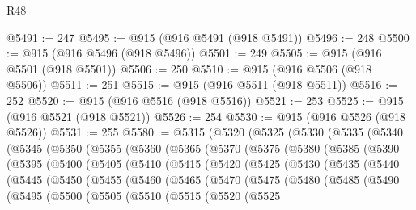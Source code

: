 \begin{lexlean}{R48}
\begin{coremodule}
@5491 := 247
@5495 := @915 (@916 @5491 (@918 @5491))
@5496 := 248
@5500 := @915 (@916 @5496 (@918 @5496))
@5501 := 249
@5505 := @915 (@916 @5501 (@918 @5501))
@5506 := 250
@5510 := @915 (@916 @5506 (@918 @5506))
@5511 := 251
@5515 := @915 (@916 @5511 (@918 @5511))
@5516 := 252
@5520 := @915 (@916 @5516 (@918 @5516))
@5521 := 253
@5525 := @915 (@916 @5521 (@918 @5521))
@5526 := 254
@5530 := @915 (@916 @5526 (@918 @5526))
@5531 := 255
@5580 := @5315
    (@5320
      (@5325
        (@5330
          (@5335
            (@5340
              (@5345
                (@5350
                  (@5355
                    (@5360
                      (@5365
                        (@5370
                          (@5375
                            (@5380
                              (@5385
                                (@5390
                                  (@5395
                                    (@5400
                                      (@5405
                                        (@5410
                                          (@5415
                                            (@5420
                                              (@5425
                                                (@5430
                                                  (@5435
                                                    (@5440
                                                      (@5445
                                                        (@5450
                                                          (@5455
                                                            (@5460
                                                              (@5465
                                                                (@5470
                                                                  (@5475
                                                                    (@5480
                                                                      (@5485
                                                                        (@5490
                                                                          (@5495
                                                                            (@5500
                                                                              (@5505
                                                                                (@5510
                                                                                  (@5515
                                                                                    (@5520
                                                                                      (@5525

\end{coremodule}
\end{lexlean}
